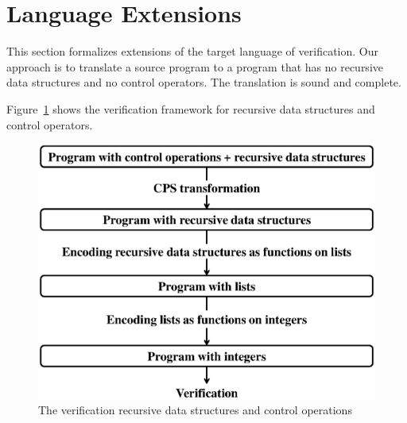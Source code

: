 \section{Language Extensions}
\label{sec:extension}

This section formalizes extensions of the target language of
verification.  Our approach is to translate a source program to a
program that has no recursive data structures and no control operators.
The translation is sound and complete.

Figure~\ref{fig:extension} shows the verification framework for recursive data structures and control
operators.

\begin{figure}
 \begin{center}
  \includegraphics[scale=0.4]{extension.eps}
 \end{center}
\caption{The verification  recursive data structures and control operations}
\label{fig:extension}
\end{figure}

